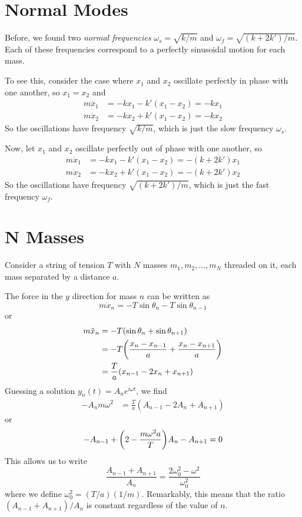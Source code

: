 \section{Normal Modes}
Before, we found two \textit{normal frequencies} $\omega_s = \sqrt{k/m}$ and $\omega_f = \sqrt{(k+2k')/m}$. Each of these frequencies correspond to a perfectly sinusoidal motion for each mass.

To see this, consider the case where $x_1$ and $x_2$ oscillate perfectly in phase with one another, so $x_1=x_2$ and
\begin{align*}
    m\ddot x_1 &= -kx_1 - k'(x_1-x_2) = -kx_1\\
    m\ddot x_2 &= -kx_2 + k'(x_1-x_2) = -kx_2
\end{align*}
So the oscillations have frequency $\sqrt{k/m}$, which is just the slow frequency $\omega_s$.

Now, let $x_1$ and $x_2$ oscillate perfectly out of phase with one another, so
\begin{align*}
    m\ddot x_1 &= -kx_1-k'(x_1-x_2) = -(k+2k')x_1 \\
    m\ddot x_2 &= -kx_2 + k'(x_1-x_2) = -(k+2k')x_2
\end{align*}
So the oscillations have frequency $\sqrt{(k+2k')/m}$, which is just the fast frequency $\omega_f$.
\section{N Masses}
Consider a string of tension $T$ with $N$ masses $m_1, m_2, \dots, m_N$ threaded on it, each mass separated by a distance $a$.

The force in the $y$ direction for mass $n$ can be written as
\[ m\ddot x_n= -T\sin\theta_{n} - T\sin\theta_{n-1}\]
or
\begin{align*}
    m\ddot x_n &= -T(\sin\theta_n + \sin\theta_{n+1}) \\
    &= -T\pqty{\frac{x_n-x_{n-1}}{a} + \frac{x_{n}-x_{n+1}}{a}} \\
    &= \frac{T}{a}(x_{n-1}-2x_n + x_{n+1})
\end{align*}
Guessing a solution $y_n(t) = A_ne^{i\omega t}$, we find
\begin{align*}
    -A_nm\omega^2 &= \frac{T}{a}(A_{n-1}-2A_n+A_{n+1})
\end{align*}
or
\[ -A_{n-1} + \pqty{2-\frac{m\omega^2 a}{T}}A_n - A_{n+1} = 0\]
This allows us to write
\[ \frac{A_{n-1}+A_{n+1}}{A_n} = \frac{2\omega_0^2-\omega^2}{\omega_0^2}\]
where we define $\omega_0^2 = (T/a)(1/m)$. Remarkably, this means that the ratio $(A_{n-1}+A_{n+1})/A_n$ is constant regardless of the value of $n$.

